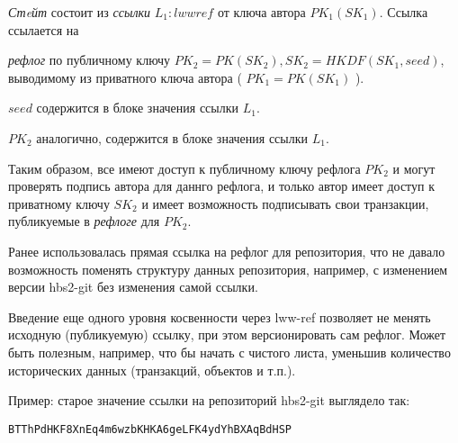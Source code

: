 \documentclass[11pt,a4paper]{article}
\begin{document}
\begin{figure}[h!]
\end{figure}

\textit{Стeйт} состоит из \textit{ссылки} $L_1 : lwwref$ от ключа автора $PK_1(SK_1)$. Ссылка ссылается на

\textit{рефлог} по публичному ключу $PK_2 = PK(SK_2), SK_2 = HKDF(SK_1,seed)$, выводимому из приватного ключа автора
 ( $PK_1 = PK(SK_1)$ ).

 $seed$ содержится в блоке значения ссылки $L_1$.

 $PK_2$ аналогично, содержится в блоке значения ссылки $L_1$.

 Таким образом, все имеют доступ к публичному ключу рефлога $PK_2$ и могут проверять подпись автора
 для даннго рефлога, и только автор имеет доступ к  приватному ключу $SK_2$ и имеет возможность
 подписывать свои транзакции, публикуемые в \textit{рефлоге} для $PK_2$.

 Ранее использовалась прямая ссылка на рефлог для репозитория, что не давало возможность
 поменять структуру данных репозитория, например, с изменением версии hbs2-git без изменения
 самой ссылки.

 Введение еще одного уровня косвенности через lww-ref позволяет не менять исходную (публикуемую)
 ссылку, при этом версионировать сам рефлог. Может быть полезным, например, что бы начать с чистого
 листа, уменьшив количество исторических данных (транзакций, объектов и т.п.).

 Пример: старое значение ссылки на репозиторий hbs2-git выглядело так:

 \begin{verbatim}
BTThPdHKF8XnEq4m6wzbKHKA6geLFK4ydYhBXAqBdHSP
 \end{verbatim}
\end{document}
